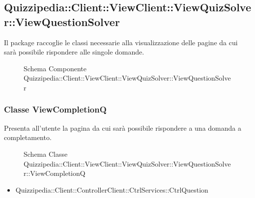 \subsection{Quizzipedia::Client::ViewClient::ViewQuizSolver::ViewQuestionSolver}
Il package raccoglie le classi necessarie alla visualizzazione delle pagine da cui sarà possibile rispondere alle singole domande.
\begin{figure}[H]
\centering
\noindent{}
\caption[Quizzipedia::Client::ViewClient::ViewQuizSolver::ViewQuestionSolver]{Schema Componente Quizzipedia::Client::ViewClient::ViewQuizSolver::ViewQuestionSolver}
\end{figure}
\subsubsection{Classe ViewCompletionQ}
Presenta all'utente la pagina da cui sarà possibile rispondere a una domanda a completamento.
\begin{figure}[H]
\centering
\noindent{}
\caption{Schema Classe Quizzipedia::Client::ViewClient::ViewQuizSolver::ViewQuestionSolver::ViewCompletionQ}
\end{figure}
\begin{itemize}
\item Quizzipedia::Client::ControllerClient::CtrlServices::CtrlQuestion
\end{itemize}
